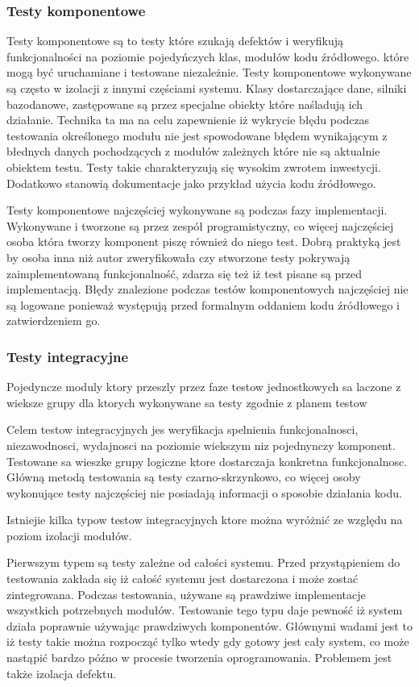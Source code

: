 \subsubsection{Testy komponentowe}
Testy komponentowe są to testy które szukają defektów i weryfikują funkcjonalności na poziomie pojedyńczych klas, modułów kodu źródłowego. które mogą być uruchamiane i testowane niezależnie. Testy komponentowe wykonywane są często w izolacji z innymi częściami systemu. Klasy dostarczające dane, silniki bazodanowe, zastępowane są przez specjalne obiekty które naśladują ich działanie. Technika ta ma na celu zapewnienie iż wykrycie błędu podczas testowania określonego modułu nie jest spowodowane błędem wynikającym z błednych danych pochodzących z modułów zależnych które nie są aktualnie obiektem testu. Testy takie charakteryzują się wysokim zwrotem inwestycji. Dodatkowo stanowią dokumentacje jako przykład użycia kodu źródłowego.

Testy komponentowe najczęściej wykonywane są podczas fazy implementacji. Wykonywane i tworzone są przez zespół programistyczny, co więcej najczęściej osoba która tworzy komponent piszę również do niego test. Dobrą praktyką jest by osoba inna niż autor zweryfikowała czy stworzone testy pokrywają zaimplementowaną funkcjonalność, zdarza się też iż test pisane są przed implementacją. Błędy znalezione podczas testów komponentowych najczęściej nie są logowane ponieważ występują przed formalnym oddaniem kodu źródłowego i zatwierdzeniem go.

\subsubsection{Testy integracyjne} 
Pojedyncze moduly ktory przeszly przez faze testow jednostkowych sa laczone z wieksze grupy dla ktorych wykonywane sa testy zgodnie z planem testow

Celem testow integracyjnych jes weryfikacja spelnienia funkcjonalnosci, niezawodnosci, wydajnosci na poziomie wiekszym niz pojednynczy komponent. Testowane sa wieszke grupy logiczne ktore dostarczaja konkretna funkcjonalnosc. Główną metodą testowania są testy czarno-skrzynkowo, co więcej osoby wykonujące testy najczęściej nie posiadają informacji o sposobie działania kodu.

Istniejie kilka typow testow integracyjnych ktore można wyróżnić ze względu na poziom izolacji modułów.

Pierwszym typem są testy zależne od całości systemu. Przed przystąpieniem do testowania zakłada się iż całość systemu jest dostarczona i może zostać zintegrowana.  Podczas testowania, używane są prawdziwe implementacje wszystkich potrzebnych modułów. Testowanie tego typu daje pewność iż system działa poprawnie używając prawdziwych komponentów. Głównymi wadami jest to iż testy takie można rozpocząć tylko wtedy gdy gotowy jest cały system, co może nastąpić bardzo późno w procesie tworzenia oprogramowania. Problemem jest także izolacja defektu.

